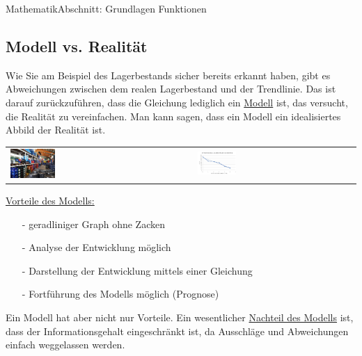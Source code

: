\documentclass[11pt,twocolumn,oneside,openany,headings=optiontotoc,11pt,numbers=noenddot]{article}
\begin{document}
\begin{worksheet}{}{Mathematik}{Abschnitt: Grundlagen Funktionen}
		\subsection{Modell vs. Realität}
		Wie Sie am Beispiel des Lagerbestands sicher bereits erkannt haben, gibt es Abweichungen zwischen dem realen Lagerbestand und der Trendlinie. Das ist darauf zurückzuführen, dass die Gleichung lediglich ein \underline{Modell} ist, das versucht, die Realität zu vereinfachen. Man kann sagen, dass ein Modell ein idealisiertes Abbild der Realität ist.\\
		\par\bigskip\noindent
		\begin{tabularx}{0.45\textwidth}{XX}
			\includegraphics[width=0.25\textwidth]{../99_Bilder/lager.jpg} & \includegraphics[width=0.25\textwidth]{../99_Bilder/bier2.jpg}
		\end{tabularx}
		\par\bigskip\noindent
		\underline{Vorteile des Modells:}
		\begin{itemize}
			\item[-] geradliniger Graph ohne Zacken
			\item[-] Analyse der Entwicklung möglich
			\item[-] Darstellung der Entwicklung mittels einer Gleichung
			\item[-] Fortführung des Modells möglich (Prognose)
		\end{itemize}
		Ein Modell hat aber nicht nur Vorteile. Ein wesentlicher \underline{Nachteil des Modells} ist, dass der Informationsgehalt eingeschränkt ist, da Ausschläge und Abweichungen einfach weggelassen werden.
		\newpage

\end{worksheet}
\end{document}
